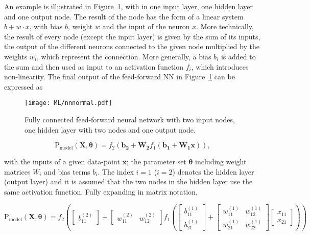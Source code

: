 An example is illustrated in Figure~\ref{ML:normalNN}, with in one input layer, one hidden layer and one output node. The result of the node has the form of a linear system $b+w\cdot x$, with bias $b$, weight $w$ and the input of the neuron $x$. More technically, the result of every node (except the input layer) is given by the sum of its inputs, the output of the different neurons connected to the given node multiplied by the weights $w_i$, which represent the connection. More generally, a bias $b_i$ is added to the sum and then used as input to an activation function $f_i$, which introduces non-linearity. The final output of the feed-forward NN in Figure~\ref{ML:normalNN} can be expressed as

\begin{figure}[htbp]
    \RawFloats
    \begin{center}
    \texttt{[image: ML/nnnormal.pdf]}
    \caption{
        Fully connected feed-forward neural network with two input nodes, one hidden layer with two nodes and one output node.
    }
    \label{ML:normalNN}
    \end{center}
\end{figure}

\begin{equation}
    \text{P}_\text{model}(\mathbf{X},\boldsymbol{\theta}) = f_2(\mathbf{b_2}+\mathbf{W_2}f_1(\mathbf{b_1}+\mathbf{W_1}\mathbf{x})),
\end{equation}

with the inputs of a given data-point $\mathbf{x}$; the parameter set $\boldsymbol{\theta}$ including weight matrices $W_i$ and bias terms $b_i$. The index $i=1$ ($i=2$) denotes the hidden layer (output layer) and it is assumed that the two nodes in the hidden layer use the same activation function. Fully expanding in matrix notation,

\begin{equation}
    \text{P}_\text{model}(\mathbf{X},\boldsymbol{\theta}) = f_2\left( \begin{bmatrix} b_{11}^{(2)} \end{bmatrix}+ \begin{bmatrix} w_{11}^{(2)} & w_{12}^{(2)}\end{bmatrix}f_1\left( \begin{bmatrix} b_{11}^{(1)} \\  
                                                            b_{21}^{(1)}  \end{bmatrix}+ \begin{bmatrix} 
    w_{11}^{(1)} & w_{12}^{(1)} \\ 
    w_{21}^{(1)} & w_{22}^{(1)}\end{bmatrix} \begin{bmatrix}
        x_{11}\\
        x_{21}
    \end{bmatrix} \right) \right)
\end{equation}

